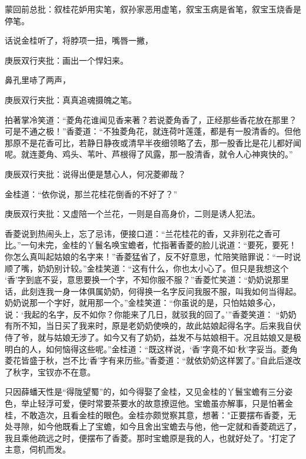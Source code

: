 
\begin{parag}

    \begin{note}蒙回前总批：叙桂花妒用实笔，叙孙家恶用虚笔，叙宝玉病是省笔，叙宝玉烧香是停笔。\end{note}
\end{parag}

\begin{parag}

    话说金桂听了，将脖项一扭，嘴唇一撇，\begin{note}庚辰双行夹批：画出一个悍妇来。\end{note}鼻孔里哧了两声，\begin{note}庚辰双行夹批：真真追魂摄魄之笔。\end{note}拍著掌冷笑道：“菱角花谁闻见香来著？若说菱角香了，正经那些香花放在那里？可是不通之极！”香菱道：“不独菱角花，就连荷叶莲蓬，都是有一股清香的。但他那原不是花香可比，若静日静夜或清早半夜细领略了去，那一股香比是花儿都好闻呢。就连菱角、鸡头、苇叶、芦根得了风露，那一股清香，就令人心神爽快的。”\begin{note}庚辰双行夹批：说得出便是慧心人，何况菱卿哉？\end{note}金桂道：“依你说，那兰花桂花倒香的不好了？”\begin{note}庚辰双行夹批：又虚陪一个兰花，一则是自高身价，二则是诱人犯法。\end{note}香菱说到热闹头上，忘了忌讳，便接口道：“兰花桂花的香，又非别花之香可比。”一句未完，金桂的丫鬟名唤宝蟾者，忙指著香菱的脸儿说道：“要死，要死！你怎么真叫起姑娘的名字来！”香菱猛省了，反不好意思，忙陪笑赔罪说：“一时说顺了嘴，奶奶别计较。”金桂笑道：“这有什么，你也太小心了。但只是我想这个 ‘香’字到底不妥，意思要换一个字，不知你服不服？”香菱忙笑道：“奶奶说那里话，此刻连我一身一体俱属奶奶，何得换一名字反问我服不服，叫我如何当得起。奶奶说那一个字好，就用那一个。”金桂笑道：“你虽说的是，只怕姑娘多心，说：‘我起的名字，反不如你？你能来了几日，就驳我的回了。’”香菱笑道： “奶奶有所不知，当日买了我来时，原是老奶奶使唤的，故此姑娘起得名字。后来我自伏侍了爷，就与姑娘无涉了。如今又有了奶奶，益发不与姑娘相干。况且姑娘又是极明白的人，如何恼得这些呢。”金桂道：“既这样说，‘香’字竟不如‘秋’字妥当。菱角菱花皆盛于秋，岂不比‘香’字有来历些。”香菱道：“就依奶奶这样罢了。”自此后遂改了秋字，宝钗亦不在意。
\end{parag}


\begin{parag}


    只因薛蟠天性是“得陇望蜀”的，如今得娶了金桂，又见金桂的丫鬟宝蟾有三分姿色，举止轻浮可爱，便时常要茶要水的故意撩逗他。宝蟾虽亦解事，只是怕著金桂，不敢造次，且看金桂的眼色。金桂亦颇觉察其意，想著："正要摆布香菱，无处寻隙，如今他既看上了宝蟾，如今且舍出宝蟾去与他，他一定就和香菱疏远了，我且乘他疏远之时，便摆布了香菱。那时宝蟾原是我的人，也就好处了。"打定了主意，伺机而发。
\end{parag}


